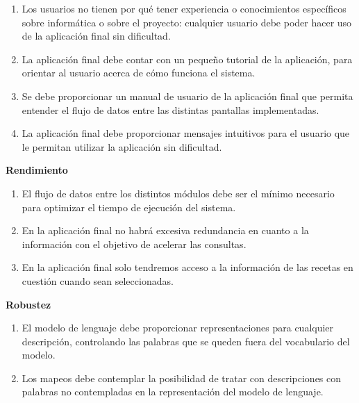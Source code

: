 \begin{enumerate}
    \item Los usuarios no tienen por qué tener experiencia o conocimientos específicos sobre informática o sobre el proyecto: cualquier usuario debe poder hacer uso de la aplicación final sin dificultad.%
    
    \item La aplicación final debe contar con un pequeño tutorial de la aplicación, para orientar al usuario acerca de cómo funciona el sistema.%
    
    \item Se debe proporcionar un manual de usuario de la aplicación final que permita entender el flujo de datos entre las distintas pantallas implementadas.%
    
    \item La aplicación final debe proporcionar mensajes intuitivos para el usuario que le permitan utilizar la aplicación sin dificultad.%

    
\end{enumerate}

\textbf{Rendimiento}

\begin{enumerate}
    \item El flujo de datos entre los distintos módulos debe ser el mínimo necesario para optimizar el tiempo de ejecución del sistema.
    
    \item En la aplicación final no habrá excesiva redundancia en cuanto a la información con el objetivo de acelerar las consultas.
    
    \item En la aplicación final solo tendremos acceso a la información de las recetas en cuestión cuando sean seleccionadas.%

\end{enumerate}

\textbf{Robustez}

\begin{enumerate}

    \item El modelo de lenguaje debe proporcionar representaciones para cualquier descripción, controlando las palabras que se queden fuera del vocabulario del modelo.
    
    \item Los mapeos debe contemplar la posibilidad de tratar con descripciones con palabras no contempladas en la representación del modelo de lenguaje.
    

    
\end{enumerate}

